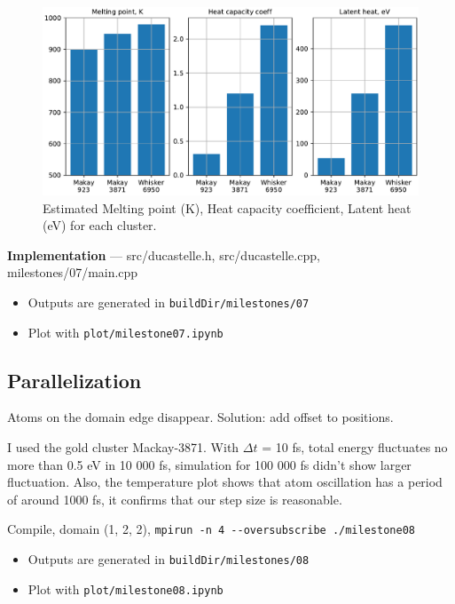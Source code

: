 \documentclass[12pt,a4paper]{article}
\begin{document}
\begin{figure}[h!]
	\centering
	\includegraphics[width=.9\linewidth]{img/milestone07-bar.pdf}
	\caption{Estimated Melting point (K), Heat capacity coefficient, Latent heat (eV) for each cluster.}
	\label{fig:heat-estimated}
\end{figure}

\newpage

{\bf Implementation} --- src/ducastelle.h, src/ducastelle.cpp, milestones/07/main.cpp

\begin{itemize}
	\item Outputs are generated in \verb|buildDir/milestones/07|
	\item Plot with \verb|plot/milestone07.ipynb|
\end{itemize}

\newpage

\subsection*{Parallelization}

Atoms on the domain edge disappear. Solution: add offset to positions.

I used the gold cluster Mackay-3871. With $\Delta t$ = 10 fs, total energy fluctuates no more than 0.5 eV in 10 000 fs, simulation for 100 000 fs didn't show larger fluctuation. Also, the temperature plot shows that atom oscillation has a period of around 1000 fs, it confirms that our step size is reasonable.

Compile, domain (1, 2, 2),
\verb|mpirun -n 4 --oversubscribe ./milestone08|

\begin{itemize}
	\item Outputs are generated in \verb|buildDir/milestones/08|
	\item Plot with \verb|plot/milestone08.ipynb|
\end{itemize}
\end{document}
